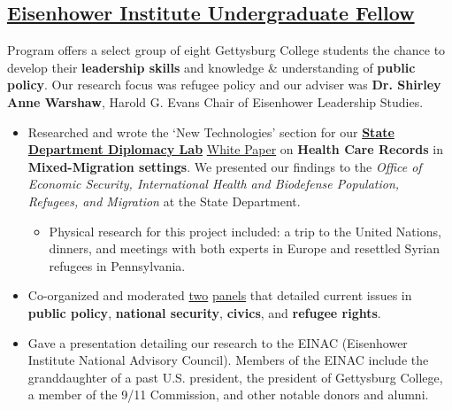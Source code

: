 \documentclass[11pt]{article}
\begin{document}
\subsection*{\underline{Eisenhower Institute Undergraduate Fellow}}
Program offers a select group of eight Gettysburg College students the chance to develop their \textbf{leadership skills} and knowledge \& understanding of \textbf{public policy}. Our research focus was refugee policy and our adviser was \textbf{Dr. Shirley Anne Warshaw}, Harold G. Evans Chair of Eisenhower Leadership Studies.\vspace{.2cm}
\begin{itemize}
\item Researched and wrote the `New Technologies' section for our \href{https://www.state.gov/s/partnerships/ppp/diplab/}{\textbf{State Department Diplomacy Lab}} \href{https://drive.google.com/file/d/0B5fjh9FZOHSYT1dhVF8yYmd4UEk/view?usp=sharing}{White Paper} on \textbf{Health Care Records} in \textbf{Mixed-Migration settings}. We presented our findings to the \textit{Office of Economic Security, International Health and Biodefense Population, Refugees, and Migration} at the State Department. 
\begin{itemize}
\item Physical research for this project included: a trip to the United Nations, dinners, and meetings with both experts in Europe and resettled Syrian refugees in Pennsylvania.
\end{itemize}
\item Co-organized and moderated \href{http://cs.gettysburg.edu/~duncjo01/assets/media/EI_panel_f16.pdf}{two} \href{http://cs.gettysburg.edu/~duncjo01/assets/media/EI_panel_s17_second.pdf}{panels} that detailed current issues in \textbf{public policy}, \textbf{national security}, \textbf{civics}, and \textbf{refugee rights}. 
\item Gave a presentation detailing our research to the EINAC (Eisenhower Institute National Advisory Council). Members of the EINAC include the granddaughter of a past U.S. president, the president of Gettysburg College, a member of the 9/11 Commission, and other notable donors and alumni.
\end{itemize}
\end{document}
